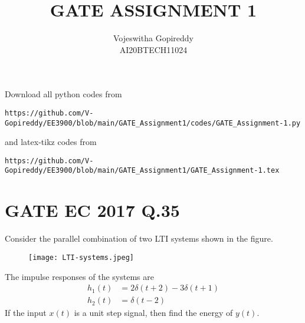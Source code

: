 \documentclass[journal,12pt,twocolumn]{IEEEtran}
\begin{document}
     \def\rightbox#1{\makebox[0in][r]{#1}}
     \def\centbox#1{\makebox[0in]{#1}}
     \def\topbox#1{\raisebox{-\baselineskip}[0in][0in]{#1}}
     \def\midbox#1{\raisebox{-0.5\baselineskip}[0in][0in]{#1}}
\vspace{3cm}
\title{GATE ASSIGNMENT 1}
\author{Vojeswitha Gopireddy \\ AI20BTECH11024}
\maketitle
\newpage
\bigskip
\renewcommand{\thefigure}{\theenumi}
\renewcommand{\thetable}{\theenumi}
Download all python codes from 
\begin{lstlisting}
https://github.com/V-Gopireddy/EE3900/blob/main/GATE_Assignment1/codes/GATE_Assignment-1.py
\end{lstlisting}
%
and latex-tikz codes from 
%
\begin{lstlisting}
https://github.com/V-Gopireddy/EE3900/blob/main/GATE_Assignment1/GATE_Assignment-1.tex
\end{lstlisting}
%
\section{GATE EC 2017 Q.35}
Consider the parallel combination of two LTI systems shown in the figure.

\begin{figure}[h]
    \centering
    \texttt{[image: LTI-systems.jpeg]}
    \label{fig:my_label}
\end{figure}

The impulse responses of the systems are
\begin{align}
    h_1(t) &= 2\delta(t+2) - 3\delta(t+1)\\
    h_2(t) &= \delta(t-2)
\end{align}
If the input $x(t)$ is a unit step signal, then find the energy of $y(t)$. 
%
\end{document}
